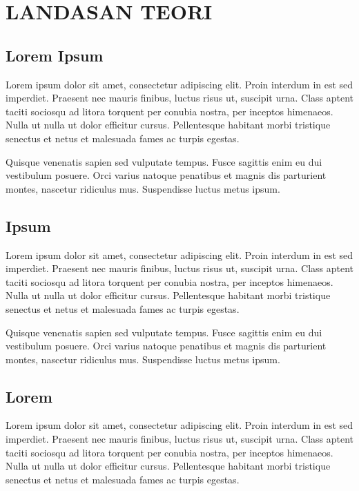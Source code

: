 \chapter{LANDASAN TEORI}

\section{Lorem Ipsum}
Lorem ipsum dolor sit amet, consectetur adipiscing elit. Proin interdum in est sed imperdiet. Praesent nec mauris finibus, luctus risus ut, suscipit urna. Class aptent taciti sociosqu ad litora torquent per conubia nostra, per inceptos himenaeos. Nulla ut nulla ut dolor efficitur cursus. Pellentesque habitant morbi tristique senectus et netus et malesuada fames ac turpis egestas.

Quisque venenatis sapien sed vulputate tempus. Fusce sagittis enim eu dui vestibulum posuere. Orci varius natoque penatibus et magnis dis parturient montes, nascetur ridiculus mus. Suspendisse luctus metus ipsum.

\section{Ipsum}
Lorem ipsum dolor sit amet, consectetur adipiscing elit. Proin interdum in est sed imperdiet. Praesent nec mauris finibus, luctus risus ut, suscipit urna. Class aptent taciti sociosqu ad litora torquent per conubia nostra, per inceptos himenaeos. Nulla ut nulla ut dolor efficitur cursus. Pellentesque habitant morbi tristique senectus et netus et malesuada fames ac turpis egestas.

Quisque venenatis sapien sed vulputate tempus. Fusce sagittis enim eu dui vestibulum posuere. Orci varius natoque penatibus et magnis dis parturient montes, nascetur ridiculus mus. Suspendisse luctus metus ipsum.

\section{Lorem}
Lorem ipsum dolor sit amet, consectetur adipiscing elit. Proin interdum in est sed imperdiet. Praesent nec mauris finibus, luctus risus ut, suscipit urna. Class aptent taciti sociosqu ad litora torquent per conubia nostra, per inceptos himenaeos. Nulla ut nulla ut dolor efficitur cursus. Pellentesque habitant morbi tristique senectus et netus et malesuada fames ac turpis egestas.

